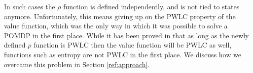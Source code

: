 In such cases the $\rho$ function is defined independently, and is not tied to states anymore.
Unfortunately, this means giving up on the PWLC property of the value function, which was the only
way in which it was possible to solve a POMDP in the first place. While it has been proved in
\cite{cit:rpomdp} that as long as the newly defined $\rho$ function is PWLC then the value function
will be PWLC as well, functions such as entropy are not PWLC in the first place. We discuss how we
overcame this problem in Section \ref{ref:approach}.

